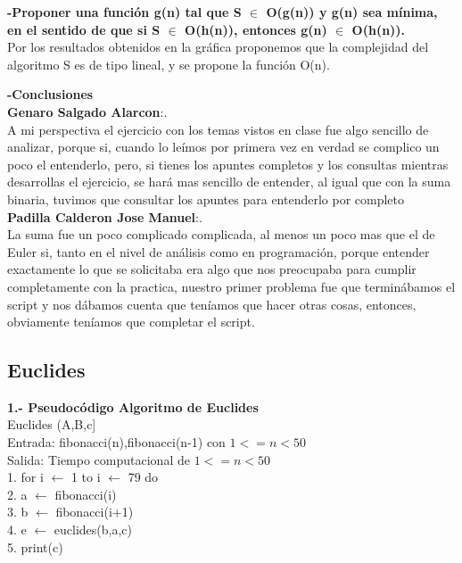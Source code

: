 \documentclass[spanish]{article}
\begin{document}
	
	
	{\large{\bf -Proponer una función g(n) tal que S $\in$ O(g(n)) y g(n) sea mínima, en el sentido de que si S $\in$  O(h(n)), entonces g(n) $\in$  O(h(n)).}}\\
	Por los resultados obtenidos en la gráfica proponemos que la complejidad del algoritmo S es de tipo lineal, y se propone la función O(n).
	\bigskip
	
	{\large {\bf -Conclusiones}}\\
	
{\bf Genaro Salgado Alarcon}:.\\A mi perspectiva el ejercicio con los temas vistos en clase fue algo sencillo de analizar, porque si, cuando lo leímos por primera vez en verdad se complico un poco el entenderlo, pero, si tienes los apuntes completos y los consultas mientras desarrollas el ejercicio, se hará mas sencillo de entender, al igual que con la suma binaria, tuvimos que consultar los apuntes para entenderlo por completo\\
{\bf Padilla Calderon Jose Manuel}:.\\La suma fue un poco complicado complicada, al menos un poco mas que el de Euler si, tanto en el nivel de análisis como en programación, porque entender exactamente lo que se solicitaba era algo que nos preocupaba para cumplir completamente con la practica, nuestro primer problema fue que terminábamos el script y nos dábamos cuenta que teníamos que hacer otras cosas, entonces, obviamente teníamos que completar el script.
\\
	
	
	\bigskip
	
	\bigskip
	\newpage
	\subsection{Euclides}
	{\large{\bf1.- Pseudoc\'odigo Algoritmo de Euclides}}\\
	Euclides (A,B,c]\\
Entrada: fibonacci(n),fibonacci(n-1) con $1<=n<50$\\
Salida: Tiempo computacional de $1<=n<50$\\
1.  for i $\leftarrow$ 1 to i $\leftarrow$ 79 do\\
2.      \hspace{0.7cm}a $\leftarrow$ fibonacci(i)\\
3.      \hspace{0.7cm}b $\leftarrow$ fibonacci(i+1)\\
4.      \hspace{0.7cm}e $\leftarrow$ euclides(b,a,c)\\
5.	   \hspace{0.7cm}print(c)\\
\end{document}
